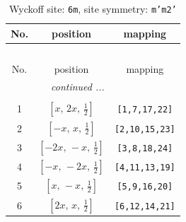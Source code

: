 \documentclass[fleqn,8pt]{jsarticle}
\begin{document}
\renewcommand{\arraystretch}{1.2}
\begin{longtable}{ccc}
\caption{Wyckoff site: {\tt 6m}, site symmetry: {\tt m'm2'}}
 \\
 \hline \hline
No. & position & mapping \\ \hline \endfirsthead

\multicolumn{2}{l}{\tablename\ \thetable{}} \\
 \hline \hline
No. & position & mapping \\ \hline \endhead

 \hline \hline
\multicolumn{2}{r}{\footnotesize\it continued ...} \\ \endfoot

 \hline \hline
\multicolumn{2}{r}{} \\ \endlastfoot

1 & $\left[ x,\, 2 x,\, \frac{1}{2} \right]$ & {\tt [1,7,17,22]} \\ \hline
2 & $\left[ - x,\, x,\, \frac{1}{2} \right]$ & {\tt [2,10,15,23]} \\ \hline
3 & $\left[ - 2 x,\, - x,\, \frac{1}{2} \right]$ & {\tt [3,8,18,24]} \\ \hline
4 & $\left[ - x,\, - 2 x,\, \frac{1}{2} \right]$ & {\tt [4,11,13,19]} \\ \hline
5 & $\left[ x,\, - x,\, \frac{1}{2} \right]$ & {\tt [5,9,16,20]} \\ \hline
6 & $\left[ 2 x,\, x,\, \frac{1}{2} \right]$ & {\tt [6,12,14,21]} \\
\end{longtable}
\renewcommand{\arraystretch}{1.2}
\end{document}
